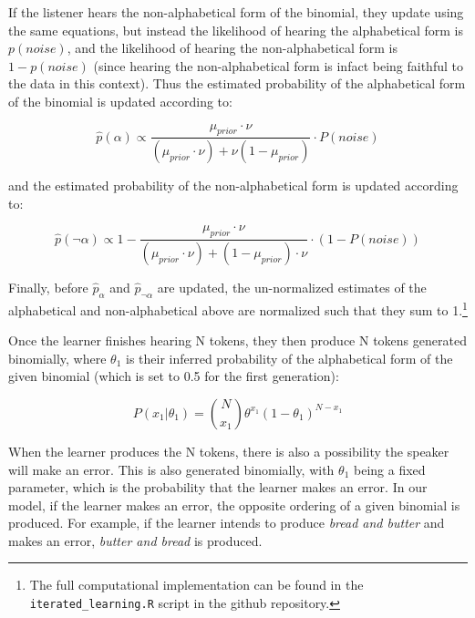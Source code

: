 \documentclass[
  jou,floatsintext]{apa6}
\begin{document}
If the listener hears the non-alphabetical form of the binomial, they update using the same equations, but instead the likelihood of hearing the alphabetical form is \(p(noise)\), and the likelihood of hearing the non-alphabetical form is \(1-p(noise)\) (since hearing the non-alphabetical form is infact being faithful to the data in this context). Thus the estimated probability of the alphabetical form of the binomial is updated according to:

\begin{equation}
\label{eq:phatAlpha2}
\hat{p}(\alpha) \propto \frac{\mu_{prior} \cdot \nu}{(\mu_{prior} \cdot \nu) + \nu(1 - \mu_{prior})} \cdot P(noise) 
\end{equation}

and the estimated probability of the non-alphabetical form is updated according to:

\begin{equation}
\label{eq:phatNonalpha2}
\hat{p}(\neg\alpha) \propto 1 - \frac{\mu_{prior} \cdot \nu}{(\mu_{prior} \cdot \nu) + (1 - \mu_{prior}) \cdot \nu} \cdot (1-P(noise)) 
\end{equation}

Finally, before \(\hat{p}_\alpha\) and \(\hat{p}_{\neg\alpha}\) are updated, the un-normalized estimates of the alphabetical and non-alphabetical above are normalized such that they sum to 1.\footnote{The full computational implementation can be found in the \texttt{iterated\_learning.R} script in the github repository.}

Once the learner finishes hearing N tokens, they then produce N tokens generated binomially, where \(\theta_1\) is their inferred probability of the alphabetical form of the given binomial (which is set to 0.5 for the first generation):

\begin{equation}
\label{eq:binomialProd}
P(x_1|\theta_1) = \binom{N}{x_1} \theta^{x_1} (1-\theta_1)^{N-x_1}
\end{equation}

When the learner produces the N tokens, there is also a possibility the speaker will make an error. This is also generated binomially, with \(\theta_1\) being a fixed parameter, which is the probability that the learner makes an error. In our model, if the learner makes an error, the opposite ordering of a given binomial is produced. For example, if the learner intends to produce \emph{bread and butter} and makes an error, \emph{butter and bread} is produced.
\end{document}
